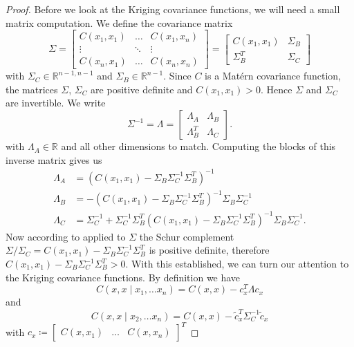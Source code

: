 \begin{proof}
Before we look at the Kriging covariance functions, we will need a small matrix computation.
We define the covariance matrix
\[ \Sigma = 
\begin{bmatrix}
C(x_{1},x_{1}) & \dots & C(x_{1},x_{n}) \\
\vdots  &  \ddots & \vdots  \\
C(x_{n},x_{1}) & \dots  &  C(x_{n},x_{n})
\end{bmatrix} = 
\begin{bmatrix}
C(x_{1},x_{1}) & \Sigma_{B} \\
\Sigma_{B}^{T}  &  \Sigma_{C}
\end{bmatrix} \] 
with \( \Sigma_{C} \in \mathbb{R}^{n-1,n-1} \) and \( \Sigma_{B} \in \mathbb{R}^{n-1} \).
Since \( C \) is a Matérn covariance function, the matrices $\Sigma$, $\Sigma_{C}$ are positive definite and $C(x_{1},x_{1}) > 0$. Hence $\Sigma$ and $\Sigma_{C}$ are invertible.
We write
\[
    \Sigma^{-1}= \Lambda = \begin{bmatrix}
    \Lambda_{A} & \Lambda_{B} \\
    \Lambda_{B}^{T}  &  \Lambda_{C}
    \end{bmatrix}.
\]
with $\Lambda_{A} \in \mathbb{R}$ and all other dimensions to match.
Computing the blocks of this inverse matrix gives us
\begin{align*}
    \Lambda_{A}&= \left( C(x_{1},x_{1})- \Sigma_{B}\Sigma_{C}^{-1}\Sigma_{B}^{T} \right)^{-1}\\
    \Lambda_{B} &= -\left( C(x_{1},x_{1})- \Sigma_{B}\Sigma_{C}^{-1}\Sigma_{B}^{T} \right)^{-1}\Sigma_{B}\Sigma_{C}^{-1}\\
    \Lambda_{C} &= \Sigma_{C}^{-1}+\Sigma_{C}^{-1}\Sigma_{B}^{T}\left( C(x_{1},x_{1})- \Sigma_{B}\Sigma_{C}^{-1}\Sigma_{B}^{T} \right)^{-1}\Sigma_{B}\Sigma_{C}^{-1}.
\end{align*}
Now according to \cite[Prop. 2.2]{gallier2019schur} applied to $\Sigma$ the Schur complement \( \Sigma/ \Sigma_{C} = C(x_{1},x_{1})- \Sigma_{B} \Sigma_{C}^{-1} \Sigma_{B}^{T}\) is positive definite, therefore
\( C(x_{1},x_{1})- \Sigma_{B} \Sigma_{C}^{-1} \Sigma_{B}^{T} > 0\).
With this established, we can turn our attention to the Kriging covariance functions.
By definition we have
\[
    C(x,x \mid x_{1}, \dots x_{n}) = C(x,x) - c_{x}^{T}\Lambda c_{x}
\]
and 
\[
    C(x,x \mid x_{2}, \dots x_{n}) = C(x,x) - \tilde{c}_{x}^{T}\Sigma_{C}^{-1} \tilde{c}_{x}
\]
with 
\( c_{x} \coloneqq \begin{bmatrix} C(x,x_{1}) &  \dots & C(x,x_{n}) \end{bmatrix}^{T} \) 

\end{proof}
